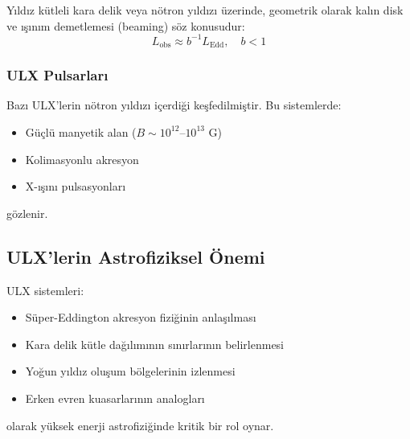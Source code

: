 Yıldız kütleli kara delik veya nötron yıldızı üzerinde, geometrik olarak kalın disk ve ışınım demetlemesi (beaming) söz konusudur:
\begin{equation}
L_{\mathrm{obs}} \approx b^{-1} L_{\mathrm{Edd}}, \quad b < 1
\end{equation}

\subsubsection{ULX Pulsarları}

Bazı ULX'lerin nötron yıldızı içerdiği keşfedilmiştir. Bu sistemlerde:
\begin{itemize}
    \item Güçlü manyetik alan ($B \sim 10^{12}$--$10^{13}$ G)
    \item Kolimasyonlu akresyon
    \item X-ışını pulsasyonları
\end{itemize}
gözlenir.

\subsection{ULX'lerin Astrofiziksel Önemi}

ULX sistemleri:
\begin{itemize}
    \item Süper-Eddington akresyon fiziğinin anlaşılması
    \item Kara delik kütle dağılımının sınırlarının belirlenmesi
    \item Yoğun yıldız oluşum bölgelerinin izlenmesi
    \item Erken evren kuasarlarının analogları
\end{itemize}
olarak yüksek enerji astrofiziğinde kritik bir rol oynar.
